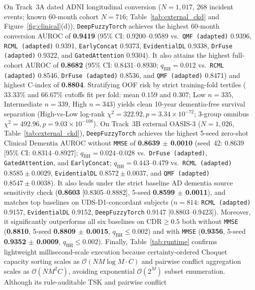 \documentclass[10pt,twocolumn]{article}
\begin{document}
On Track~3A dated ADNI longitudinal conversion ($N=1,017$, 268 incident events; known 60-month
cohort $N=716$; Table~\ref{tab:external_ckd} and Figure~\ref{fig:clinical}(d)),
\texttt{DeepFuzzyTorch} achieves the highest 60-month conversion AUROC of \textbf{0.9419} (95\%
CI: 0.9200--0.9589 vs.\ \texttt{QMF (adapted)} 0.9396, \texttt{RCML (adapted)} 0.9391,
\texttt{EarlyConcat} 0.9373, \texttt{EvidentialDL} 0.9338, \texttt{DrFuse (adapted)} 0.9322,
and \texttt{GatedAttention} 0.9304). It also attains the highest full-cohort AUROC of
\textbf{0.8682} (95\%
CI: 0.8431--0.8930; $q_{\text{BH}}=0.012$ vs.\ \texttt{RCML (adapted)} 0.8546,
\texttt{DrFuse (adapted)} 0.8536, and \texttt{QMF (adapted)} 0.8471) and highest C-index of
\textbf{0.8804}. Stratifying OOF risk by strict training-fold tertiles ($33.33\%$ and $66.67\%$
cutoffs fit per fold: mean $0.159$ and $0.307$; Low $n=335$, Intermediate $n=339$, High
$n=343$) yields clean 10-year dementia-free survival separation (High-vs-Low log-rank $\chi^2 =
322.92, p = 3.34 \times 10^{-72}$; 3-group omnibus $\chi^2 = 492.96, p = 9.03 \times
10^{-108}$). On Track~3B external OASIS-3 ($N=1,026$, Table~\ref{tab:external_ckd}),
\texttt{DeepFuzzyTorch} achieves the highest 5-seed zero-shot Clinical Dementia AUROC without
\texttt{MMSE} of \textbf{0.8639 $\pm$ 0.0010} (seed~42: 0.8639 [95\%
CI: 0.8314--0.8927]; $q_{\text{BH}}=0.024\text{--}0.028$ vs.\ \texttt{DrFuse (adapted)},
\texttt{GatedAttention}, and \texttt{EarlyConcat}; $q_{\text{BH}}=0.443\text{--}0.479$ vs.\
\texttt{RCML (adapted)} $0.8585 \pm 0.0029$, \texttt{EvidentialDL} $0.8572 \pm 0.0037$, and
\texttt{QMF (adapted)} $0.8547 \pm 0.0038$). It also leads under the strict baseline AD
dementia source
sensitivity check (\textbf{0.8603} [0.8305--0.8882], 5-seed \textbf{0.8599 $\pm$ 0.0011}), and
matches top baselines on UDS-D1-concordant subjects ($n=814$: \texttt{RCML (adapted)} 0.9157,
\texttt{EvidentialDL} 0.9152, \texttt{DeepFuzzyTorch} 0.9147 [0.8803--0.9423]). Moreover, it
significantly outperforms all six baselines on $\text{CDR}\ge 0.5$ both without \texttt{MMSE}
(\textbf{0.8810}, 5-seed \textbf{0.8809 $\pm$ 0.0015}, $q_{\text{BH}} \le 0.002$) and with
\texttt{MMSE} (\textbf{0.9356}, 5-seed \textbf{0.9352 $\pm$ 0.0009}, $q_{\text{BH}} \le
0.002$). Finally, Table~\ref{tab:runtime} confirms lightweight millisecond-scale execution
because certainty-ordered Choquet capacity sorting scales as $\mathcal{O}(NM\log M\cdot C)$ and
pairwise conflict aggregation scales as $\mathcal{O}(NM^2 C)$, avoiding exponential
$\mathcal{O}(2^M)$ subset enumeration. Although its rule-auditable TSK and pairwise conflict
\end{document}
